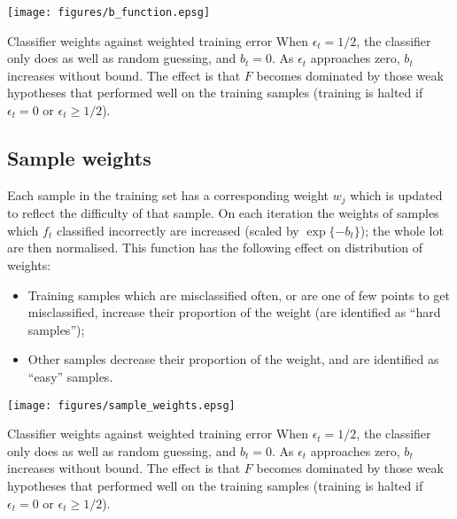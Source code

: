 \begin{linefigure}
\begin{center}
\texttt{[image: figures/b\_function.epsg]}
\end{center}
\begin{capt}{Classifier weights against weighted training error}
When $\epsilon_t = 1/2$, the classifier only does as well as random
guessing, and $b_t = 0$.  As $\epsilon_t$ approaches zero, $b_t$
increases without bound.  The effect is that $F$ becomes dominated by
those weak hypotheses that performed well on the training samples
(training is halted if $\epsilon_t = 0$ or $\epsilon_t \geq
1/2$).
\end{capt}
\end{linefigure}


\subsection{Sample weights}
\label{sec:sample weights}

Each sample in the training set has a corresponding weight $w_j$ which
is updated to reflect the difficulty of that sample.  On each iteration the
weights of samples which $f_t$ classified incorrectly are increased
(scaled by $\exp \{ -b_t \}$); the whole lot are then normalised.
This function has the following effect on distribution of weights:

\begin{itemize}

\item	Training samples which are misclassified often, or are one of 
	few points to get misclassified, increase their proportion of
	the weight (are identified as ``hard samples'');

\item	Other samples decrease their proportion of the weight, and are
	identified as ``easy'' samples.

\end{itemize}

\begin{linefigure}
\begin{center}
\texttt{[image: figures/sample\_weights.epsg]}
\end{center}
\begin{capt}{Classifier weights against weighted training error}
When $\epsilon_t = 1/2$, the classifier only does as well as random
guessing, and $b_t = 0$.  As $\epsilon_t$ approaches zero, $b_t$
increases without bound.  The effect is that $F$ becomes dominated by
those weak hypotheses that performed well on the training samples
(training is halted if $\epsilon_t = 0$ or $\epsilon_t \geq
1/2$).
\end{capt}
\end{linefigure}

